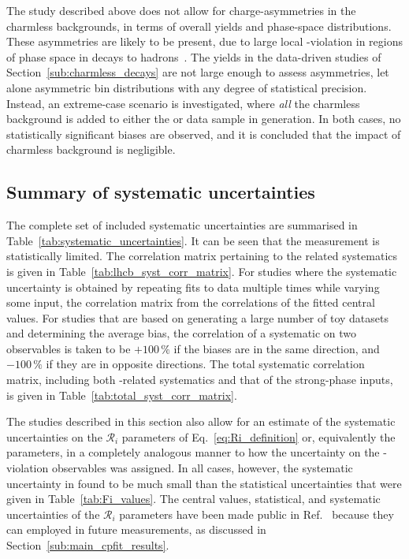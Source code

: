The study described above does not allow for charge-asymmetries in the charmless backgrounds, in terms of overall yields and phase-space distributions. These asymmetries are likely to be present, due to large local \CP-violation in regions of phase space in \Bpm decays to hadrons~\cite{}. The yields in the data-driven studies of Section~\ref{sub:charmless_decays} are not large enough to assess asymmetries, let alone asymmetric bin distributions with any degree of statistical precision. Instead, an extreme-case scenario is investigated, where \emph{all} the charmless background is added to either the \Bp or \Bm data sample in generation. In both cases, no statistically significant biases are observed, and it is concluded that the impact of charmless background is negligible.



\subsection{Summary of systematic uncertainties} %
\label{sub:summary_of_systematic_uncertainties}

The complete set of included systematic uncertainties are summarised in Table~\ref{tab:systematic_uncertainties}. It can be seen that the measurement is statistically limited. The correlation matrix pertaining to the \lhcb related systematics is given in Table~\ref{tab:lhcb_syst_corr_matrix}. For studies where the systematic uncertainty is obtained by repeating fits to data multiple times while varying some input, the correlation matrix from the correlations of the fitted central values. For studies that are based on generating a large number of toy datasets and determining the average bias, the correlation of a systematic on two observables is taken to be $+100\,\%$ if the biases are in the same direction, and $-100\,\%$ if they are in opposite directions. The total systematic correlation matrix, including both \lhcb-related systematics and that of the strong-phase inputs, is given in Table~\ref{tab:total_syst_corr_matrix}.





The studies described in this section also allow for an estimate of the systematic uncertainties on the $\mathcal R_i$ parameters of Eq.~\eqref{eq:Ri_definition} or, equivalently the \Fi parameters, in a completely analogous manner to how the uncertainty on the \CP-violation observables was assigned. In all cases, however, the systematic uncertainty in found to be much small than the statistical uncertainties that were given in Table~\ref{tab:Fi_values}. The central values, statistical, and systematic uncertainties of the $\mathcal R_i$ parameters have been made public in Ref.~\cite{B2Dh-GGSZ} because they can employed in future \lhcb measurements, as discussed in Section~\ref{sub:main_cpfit_results}.

